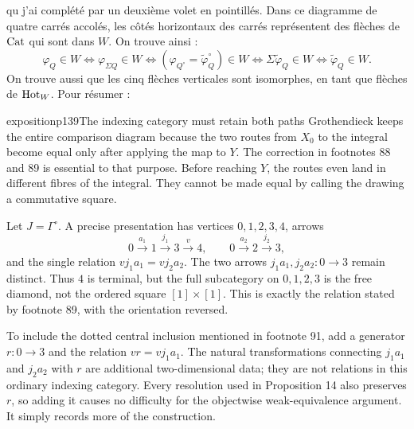 qu j'ai complété par un deuxième volet en pointillés. Dans ce diagramme de quatre carrés accolés, les côtés horizontaux des carrés représentent des flèches de $\mathrm{Cat}$ qui sont dans $W$. On trouve ainsi : %
\[
\varphi_Q\in W \iff \varphi_{\Sigma Q}\in W \iff (\varphi_{Q^\circ}=\tilde{\varphi}_Q^\circ)\in W \iff \Sigma\tilde{\varphi}_Q\in W \iff \tilde{\varphi}_Q\in W.
\]
On trouve aussi que les cinq flèches verticales sont isomorphes, en tant que flèches de $\mathrm{Hot}_W$. Pour résumer :

\begin{dcomment}{exposition}{p139}{The indexing category must retain both paths}
Grothendieck keeps the entire comparison diagram because the two routes from $X_0$ to the integral become equal only after applying the map to $Y$. The correction in footnotes 88 and 89 is essential to that purpose. Before reaching $Y$, the routes even land in different fibres of the integral. They cannot be made equal by calling the drawing a commutative square.

Let $J=\Gamma^\circ$. A precise presentation has vertices $0,1,2,3,4$, arrows
\[
 0\xrightarrow{a_1}1\xrightarrow{j_1}3\xrightarrow{v}4,
 \qquad
 0\xrightarrow{a_2}2\xrightarrow{j_2}3,
\]
and the single relation $v j_1a_1=v j_2a_2$. The two arrows $j_1a_1,j_2a_2:0\to3$ remain distinct. Thus $4$ is terminal, but the full subcategory on $0,1,2,3$ is the free diamond, not the ordered square $[1]\times[1]$. This is exactly the relation stated by footnote 89, with the orientation reversed.

To include the dotted central inclusion mentioned in footnote 91, add a generator $r:0\to3$ and the relation $vr=vj_1a_1$. The natural transformations connecting $j_1a_1$ and $j_2a_2$ with $r$ are additional two-dimensional data; they are not relations in this ordinary indexing category. Every resolution used in Proposition 14 also preserves $r$, so adding it causes no difficulty for the objectwise weak-equivalence argument. It simply records more of the construction.
\end{dcomment}


